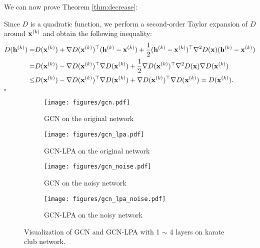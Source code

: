 \documentclass{article}
\newenvironment{proof}{{\noindent\it Proof.}\quad}{\hfill $\square$\par}
\begin{document}
		We can now prove Theorem \ref{thm:decrease}:
		
		\begin{proof}
			Since $D$ is a quadratic function, we perform a second-order Taylor expansion of $D$ around ${\bf x}^{{(k)}}$ and obtain the following inequality:
			\begin{equation}
			\begin{split}
				D({\bf h}^{(k)}) = & D({\bf x}^{(k)}) + \nabla D({\bf x}^{(k)})^\top ({\bf h}^{(k)} - {\bf x}^{(k)}) + \frac{1}{2} ({\bf h}^{(k)} - {\bf x}^{(k)})^\top \nabla^2 D({\bf x}) ({\bf h}^{(k)} - {\bf x}^{(k)}) \\
				= & D({\bf x}^{(k)}) - \nabla D({\bf x}^{(k)})^\top \nabla D({\bf x}^{(k)}) + \frac{1}{2} \nabla D({\bf x}^{(k)})^\top \nabla^2 D({\bf x}) \nabla D({\bf x}^{(k)}) \\
				\leq & D({\bf x}^{(k)}) - \nabla D({\bf x}^{(k)})^\top \nabla D({\bf x}^{(k)}) + \nabla D({\bf x}^{(k)})^\top \nabla D({\bf x}^{(k)}) = D({\bf x}^{(k)}).
			\end{split}
			\end{equation}
		\end{proof}
		
		\begin{figure}[h]
			\centering
			\begin{subfigure}[b]{\textwidth}
   				\texttt{[image: figures/gcn.pdf]}
   				\caption{GCN on the original network}
   				\label{fig:app_karate_1}
			\end{subfigure}
			\hfill
			\begin{subfigure}[b]{\textwidth}
				\texttt{[image: figures/gcn\_lpa.pdf]}
				\caption{GCN-LPA on the original network}
				\label{fig:app_karate_2}
			\end{subfigure}
			\hfill
			\begin{subfigure}[b]{\textwidth}
   				\texttt{[image: figures/gcn\_noise.pdf]}
   				\caption{GCN on the noisy network}
   				\label{fig:app_karate_3}
			\end{subfigure}
			\hfill
			\begin{subfigure}[b]{\textwidth}
				\texttt{[image: figures/gcn\_lpa\_noise.pdf]}
				\caption{GCN-LPA on the noisy network}
				\label{fig:app_karate_4}
			\end{subfigure}
			\caption{Visualization of GCN and GCN-LPA with 1 $\sim$ 4 layers on karate club network.}
			\label{fig:app_karate}
		\end{figure}
		
\end{document}
